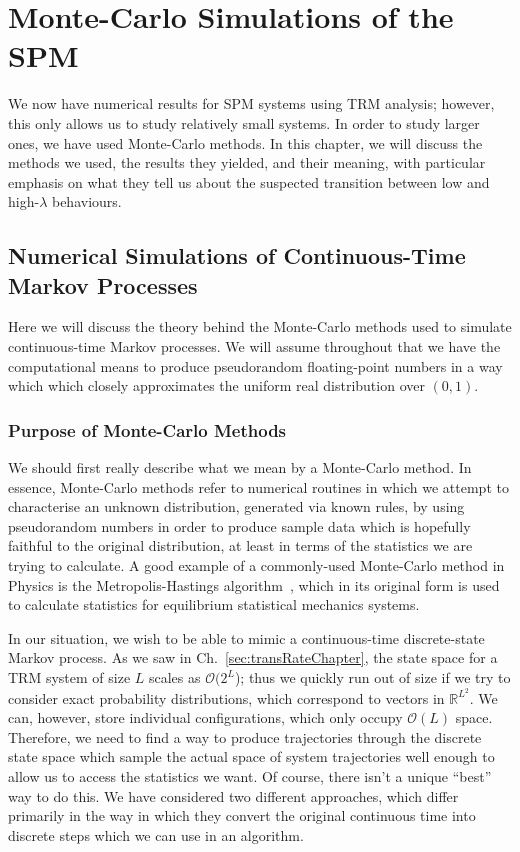 \chapter{Monte-Carlo Simulations of the SPM} 
\label{sec:numerics}
We now have numerical results for SPM systems using TRM analysis; however, this only allows us to study
relatively small systems. In order to study larger ones, we have used Monte-Carlo methods. In this
chapter, we will discuss the methods we used, the results they yielded, and their meaning, with 
particular emphasis on what they tell us about the suspected transition between low and high-$\lambda$
behaviours.
\section{Numerical Simulations of Continuous-Time Markov Processes}
Here we will discuss the theory behind the Monte-Carlo methods used to simulate continuous-time Markov
processes. We will assume throughout that we have the computational means to produce pseudorandom
floating-point numbers in a way which which closely approximates the uniform real distribution over $(0, 1)$.
\subsection{Purpose of Monte-Carlo Methods}
We should first really describe what we mean by a Monte-Carlo method. In essence, Monte-Carlo methods
refer to numerical routines in which we attempt to characterise an unknown distribution, generated 
via known rules, by using
pseudorandom numbers in order to produce sample data which is hopefully faithful to the original 
distribution, at least in terms of the statistics we are trying to calculate. A good example of a
commonly-used Monte-Carlo method in Physics is the Metropolis-Hastings algorithm~\cite{metHastAlg}, which in its original
form is used to calculate statistics for equilibrium statistical mechanics systems.

In our situation, we wish to be able to mimic a continuous-time discrete-state Markov process.
As we saw in Ch.~\ref{sec:transRateChapter}, the state space for a TRM system of size $L$
scales as
$\mathcal{O}(2^L$); thus we quickly run out of size if we try to consider exact probability distributions, which correspond to
vectors in $\mathbb{R}^{L^2}$. We can, however, store individual configurations, which only occupy
$\mathcal{O}(L)$ space. Therefore, we need to find a way to produce trajectories through the discrete
state space which sample the actual space of system trajectories well enough to allow us to access the
statistics we want. Of course, there isn't a unique ``best'' way to do this. We have considered two
different approaches, which differ primarily in the way in which they convert the original continuous 
time into discrete steps which we can use in an algorithm.

